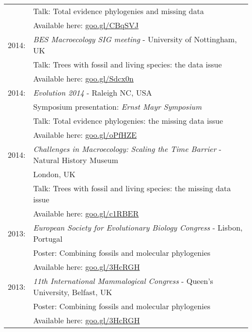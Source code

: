 \documentclass[10pt,a4paper]{article}
\begin{document}
{\begin{tabular}{ll}
& Talk: Total evidence phylogenies and missing data\\
& Available here: \href{http://figshare.com/articles/Total_evidence_phylogenies_the_missing_data_issue/1086216}{goo.gl/CBqSVJ}\\
2014: & \textit{BES Macroecology SIG meeting} - University of Nottingham, UK\\
& Talk: Trees with fossil and living species: the data issue\\ 
& Available here: \href{http://figshare.com/articles/Trees_with_fossil_and_living_species_the_data_issue/1056307}{goo.gl/Sdcx0n}\\
2014: & \textit{Evolution 2014} - Raleigh NC, USA\\
& Symposium presentation: \textit{Ernst Mayr Symposium} \\
& Talk: Total evidence phylogenies: the missing data issue\\
& Available here: \href{http://figshare.com/articles/Total_evidence_phylogenies_the_missing_data_issue/1086216}{goo.gl/oPfHZE}\\
2014: & \textit{Challenges in Macroecology: Scaling the Time Barrier} - Natural History Museum \\
& London, UK\\
& Talk: Trees with fossil and living species: the missing data issue\\
& Available here: \href{http://figshare.com/articles/Trees_with_fossil_and_living_species_the_data_issue/1056307}{goo.gl/c1RBER}\\
2013: & \textit{European Society for Evolutionary Biology Congress} - Lisbon, Portugal\\
& Poster: Combining fossils and molecular phylogenies\\
& Available here: \href{http://figshare.com/articles/Combining_fossils_and_molecular_phylogenies/1056300}{goo.gl/3HcRGH}\\
2013: & \textit{11th International Mammalogical Congress} - Queen's University, Belfast, UK \\
& Poster: Combining fossils and molecular phylogenies\\
& Available here: \href{http://figshare.com/articles/Combining_fossils_and_molecular_phylogenies/1056300}{goo.gl/3HcRGH}\\
\end{tabular}
\bigskip

}
\end{document}
